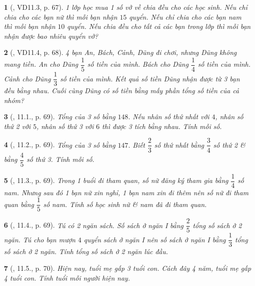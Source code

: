 \documentclass{article}
\newtheorem{baitoan}{}
\begin{document}
\begin{baitoan}[\cite{TLCT_THCS_Toan_6_so_hoc}, VD11.3, p. 67]
	1 lớp học mua 1 số vở về chia đều cho các học sinh. Nếu chỉ chia cho các bạn nữ thì mỗi bạn nhận $15$ quyển. Nếu chỉ chia cho các bạn nam thì mỗi bạn nhận $10$ quyển. Nếu chia đều cho tất cả các bạn trong lớp thì mỗi bạn nhận được bao nhiêu quyển vở?
\end{baitoan}

\begin{baitoan}[\cite{TLCT_THCS_Toan_6_so_hoc}, VD11.4, p. 68]
	4 bạn An, Bách, Cảnh, Dũng đi chơi, nhưng Dũng không mang tiền. An cho Dũng $\dfrac{1}{5}$ số tiền của mình. Bách cho Dũng $\dfrac{1}{4}$ số tiền của mình. Cảnh cho Dũng $\dfrac{1}{3}$ số tiền của mình. Kết quả số tiền Dũng nhận được từ 3 bạn đều bằng nhau. Cuối cùng Dũng có số tiền bằng mấy phần tổng số tiền của cả nhóm?
\end{baitoan}

\begin{baitoan}[\cite{TLCT_THCS_Toan_6_so_hoc}, 11.1., p. 69]
	Tổng của 3 số bằng $148$. Nếu nhân số thứ nhất với $4$, nhân số thứ 2 với $5$, nhân số thứ 3 với $6$ thì được 3 tích bằng nhau. Tính mỗi số.
\end{baitoan}

\begin{baitoan}[\cite{TLCT_THCS_Toan_6_so_hoc}, 11.2., p. 69]
	Tổng của 3 số bằng $147$. Biết $\dfrac{2}{3}$ số thứ nhất bằng $\dfrac{3}{4}$ số thứ 2 \& bằng $\dfrac{4}{5}$ số thứ 3. Tính mỗi số.
\end{baitoan}

\begin{baitoan}[\cite{TLCT_THCS_Toan_6_so_hoc}, 11.3., p. 69]
	Trong 1 buổi đi tham quan, số nữ đăng ký tham gia bằng $\dfrac{1}{4}$ số nam. Nhưng sau đó 1 bạn nữ xin nghỉ, 1 bạn nam xin đi thêm nên số nữ đi tham quan bằng $\dfrac{1}{5}$ số nam. Tính số học sinh nữ \& nam đã đi tham quan.
\end{baitoan}

\begin{baitoan}[\cite{TLCT_THCS_Toan_6_so_hoc}, 11.4., p. 69]
	Tú có 2 ngăn sách. Số sách ở ngăn I bằng $\dfrac{2}{5}$ tổng số sách ở 2 ngăn. Tú cho bạn mượn $4$ quyển sách ở ngăn I nên số sách ở ngăn I bằng $\dfrac{1}{3}$ tổng số sách ở 2 ngăn. Tính tổng số sách ở 2 ngăn lúc đầu.
\end{baitoan}

\begin{baitoan}[\cite{TLCT_THCS_Toan_6_so_hoc}, 11.5., p. 70]
	Hiện nay, tuổi mẹ gấp 3 tuổi con. Cách đây 4 năm, tuổi mẹ gấp 4 tuổi con. Tính tuổi mỗi người hiện nay.
\end{baitoan}
\end{document}
